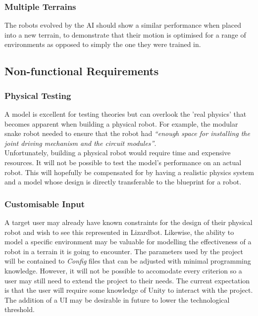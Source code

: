 \documentclass{article}
\begin{document}
\subsubsection{Multiple Terrains}
\label{sec:Multiple Terrains}
The robots evolved by the AI should show a similar performance when placed into a new terrain, to demonstrate that their motion is optimised for a range of environments as opposed to simply the one they were trained in.

\subsection{Non-functional Requirements}
\label{sec:Non-functional Requirements}
\subsubsection{Physical Testing}
\label{sec:Physical Testing}
A model is excellent for testing theories but can overlook the 'real physics' that becomes apparent when building a physical robot. For example, the modular snake robot needed to ensure that the robot had \textit{“enough space for installing the joint driving mechanism and the circuit modules”}.  \\
Unfortunately, building a physical robot would require time and expensive resources. It will not be possible to test the model’s performance on an actual robot. This will hopefully be compensated for by having a realistic physics system and a model whose design is directly transferable to the blueprint for a robot.

\subsubsection{Customisable Input}
\label{sec:Customisable Input}
A target user may already have known constraints for the design of their physical robot and wish to see this represented in Lizardbot. Likewise, the ability to model a specific environment may be valuable for modelling the effectiveness of a robot in a terrain it is going to encounter.
The parameters used by the project will be contained to \textit{Config} files that can be adjusted with minimal programming knowledge. However, it will not be possible to accomodate every criterion so a user may still need to extend the project to their needs. 
The current expectation is that the user will require some knowledge of Unity to interact with the project. The addition of a UI may be desirable in future to lower the technological threshold. 
\end{document}
